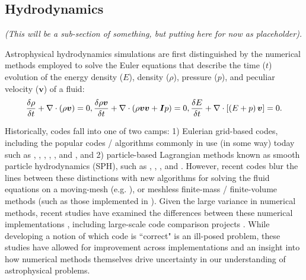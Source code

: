 \subsection{Hydrodynamics}
\textit{(This will be a sub-section of something, but putting here for now as placeholder).}

Astrophysical hydrodynamics simulations are first distinguished by the numerical methods employed to solve the Euler equations that describe the time ($t$) evolution of the energy density ($E$), density ($\rho$), pressure ($p$), and peculiar velocity ($\bm{v}$) of a fluid:
\begin{equation}
  \frac{\delta \rho}{\delta t} + \nabla \cdot \left(\rho \bm{v}\right)  = 0,\\
  \frac{\delta \rho \bm{v}}{\delta t} + \nabla \cdot \left(\rho \bm{v}\bm{v} + \bm{I}p \right) = 0,\\
  \frac{\delta E}{\delta t} + \nabla \cdot \left[\left(E +p\right)\bm{v}\right] = 0.
\end{equation}

Historically, codes fall into one of two camps: 1) Eulerian grid-based codes, including the popular codes / algorithms commonly in use (in some way) today such as  \citep{StoneNorman1992},  \citep{FLASH},  \citep{Teyssier2002},  \citep{Athena},  \citep{Rudd2008}, and  \citep{Enzo2014}, and 2) particle-based Lagrangian methods known as smooth particle hydrodynamics (SPH), such as  \citep{Springel2005},  \citep{Stadel2001},  \citep{Wadsley2004}, and  \citep{Menon2015}. However, recent codes blur the lines between these distinctions with new algorithms for solving the fluid equations on a moving-mesh (e.g.  \citep{Springel2010}), or meshless finite-mass / finite-volume methods (such as those implemented in  \citep{Hopkins2015}). Given the large variance in numerical methods, recent studies have examined the differences between these numerical implementations \citep[e.g.][]{Agertz2007}, including large-scale code comparison projects \citep[e.g.][]{AGORA,AGORA2}. While developing a notion of which code is ``correct" is an ill-posed problem, these studies have allowed for improvement across implementations and an insight into how numerical methods themselves drive uncertainty in our understanding of astrophysical problems.

